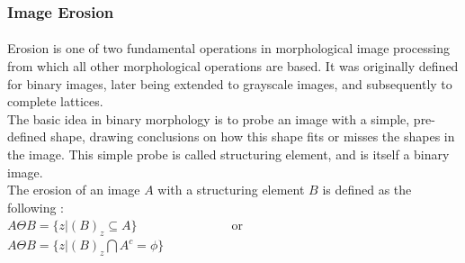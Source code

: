\documentclass{article}
\begin{document}
		\subsubsection{Image Erosion}
		\paragraph{}
		Erosion is one of two fundamental operations in morphological image processing from which all other morphological operations are based. It was originally defined for binary images, later being extended to grayscale images, and subsequently to complete lattices.\\
		The basic idea in binary morphology is to probe an image with a simple, pre-defined shape, drawing conclusions on how this shape fits or misses the shapes in the image. This simple probe is called structuring element, and is itself a binary image.\\
		The erosion of an image $A$ with a structuring element $B$ is defined as the following : \\
		$A\Theta B = \{z|(B)_{z} \subseteq A \}$\ \ \ \ \ \ \ \ \ \ \ \ \ \ \ or \ \ \ \ \ \ \ \ \ \ \ \ \ \ \ $A\Theta B = \{z|(B)_{z}\bigcap A^{c} = \phi \}$

		\paragraph{}
		\paragraph{}
\end{document}
